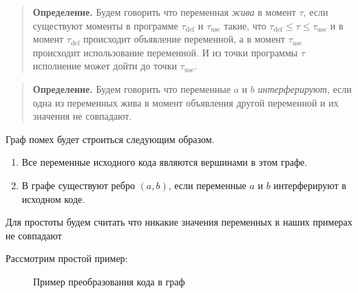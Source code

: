 \documentclass[12pt]{article}
\begin{document}
\begin{quote}
    \textbf{Определение.}
    Будем говорить что переменная \textit{жива} в момент $\tau$, если существуют моменты в программе $\tau_{\text{def}}$ и
    $\tau_{\text{use}}$ такие, что $\tau_{\text{def}} \leq \tau \leq \tau_{\text{use}}$ и в момент $\tau_{\text{def}}$ происходит
    объявление переменной, а в момент $\tau_{\text{use}}$ происходит использование переменной. И из точки программы $\tau$
    исполнение может дойти до точки $\tau_{\text{use}}$.
\end{quote}

\begin{quote}
    \textbf{Определение.}
    Будем говорить что переменные $a$ и $b$ \textit{интерферируют}, если одна из переменных жива в момент объявления
    другой переменной и их значения не совпадают.
\end{quote}

Граф помех будет строиться следующим образом.
\begin{enumerate}
    \item Все переменные исходного кода являются вершинами в этом графе.
    \item В графе существуют ребро $(a, b)$, если переменные $a$ и $b$ интерферируют в исходном коде.
\end{enumerate}

Для простоты будем считать что никакие значения переменных в наших примерах не совпадают

Рассмотрим простой пример:
\begin{figure}[H]
    \centering
\caption{Пример преобразования кода в граф}
\label{fig:ex1}
\end{figure}
\end{document}
